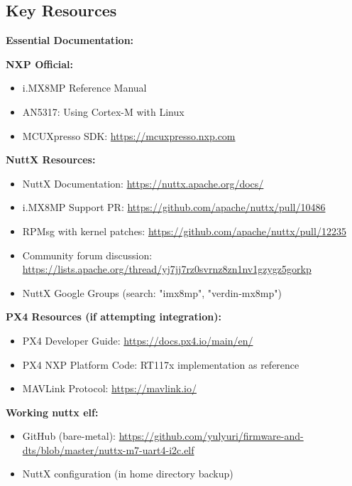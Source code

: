 \documentclass[12pt,a4paper]{report}
\begin{document}
\subsection{Key Resources}

\begin{docref}
\textbf{Essential Documentation:}

\textbf{NXP Official:}
\begin{itemize}
    \item i.MX8MP Reference Manual
    \item AN5317: Using Cortex-M with Linux
    \item MCUXpresso SDK: \url{https://mcuxpresso.nxp.com}
\end{itemize}

\textbf{NuttX Resources:}
\begin{itemize}
    \item NuttX Documentation: \url{https://nuttx.apache.org/docs/}
    \item i.MX8MP Support PR: \url{https://github.com/apache/nuttx/pull/10486}
    \item RPMsg with kernel patches: \url{https://github.com/apache/nuttx/pull/12235}
    \item Community forum discussion: \url{https://lists.apache.org/thread/yj7jj7rz0svrnz8zn1nv1gzygz5gorkp}
    \item NuttX Google Groups (search: "imx8mp", "verdin-mx8mp")
\end{itemize}

\textbf{PX4 Resources (if attempting integration):}
\begin{itemize}
    \item PX4 Developer Guide: \url{https://docs.px4.io/main/en/}
    \item PX4 NXP Platform Code: RT117x implementation as reference
    \item MAVLink Protocol: \url{https://mavlink.io/}
\end{itemize}

\textbf{Working nuttx elf:}
\begin{itemize}
    \item GitHub (bare-metal): \url{https://github.com/yulyuri/firmware-and-dts/blob/master/nuttx-m7-uart4-i2c.elf}
    \item NuttX configuration (in home directory backup)
\end{itemize}


\end{docref}
\end{document}
